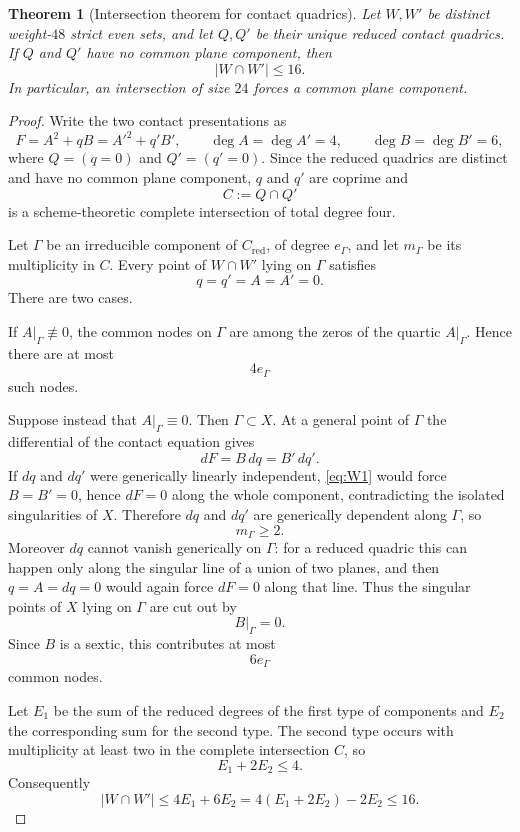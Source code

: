\documentclass[11pt,reqno]{amsart}
\newtheorem{theorem}{Theorem}[section]
\theoremstyle{remark}
\begin{document}
\begin{theorem}[Intersection theorem for contact quadrics]\label{thm:contact48}
Let $W,W'$ be distinct weight-$48$ strict even sets, and let $Q,Q'$ be their unique reduced contact quadrics.  If $Q$ and $Q'$ have no common plane component, then
\[
|W\cap W'|\le16.
\]
In particular, an intersection of size $24$ forces a common plane component.
\end{theorem}

\begin{proof}
Write the two contact presentations as
\[
F=A^2+qB=A'^2+q'B',
\qquad
\deg A=\deg A'=4,
\qquad
\deg B=\deg B'=6,
\]
where $Q=(q=0)$ and $Q'=(q'=0)$.  Since the reduced quadrics are distinct and have no common plane component, $q$ and $q'$ are coprime and
\[
C:=Q\cap Q'
\]
is a scheme-theoretic complete intersection of total degree four.

Let $\Gamma$ be an irreducible component of $C_{\mathrm{red}}$, of degree $e_\Gamma$, and let $m_\Gamma$ be its multiplicity in $C$.  Every point of $W\cap W'$ lying on $\Gamma$ satisfies
\[
q=q'=A=A'=0.
\]
There are two cases.

If $A|_\Gamma\not\equiv0$, the common nodes on $\Gamma$ are among the zeros of the quartic $A|_\Gamma$.  Hence there are at most
\[
4e_\Gamma
\]
such nodes.

Suppose instead that $A|_\Gamma\equiv0$.  Then $\Gamma\subset X$.  At a general point of $\Gamma$ the differential of the contact equation gives
\[
dF=B\,dq=B'\,dq'. \tag{W1}\label{eq:W1}
\]
If $dq$ and $dq'$ were generically linearly independent, \eqref{eq:W1} would force $B=B'=0$, hence $dF=0$ along the whole component, contradicting the isolated singularities of $X$.  Therefore $dq$ and $dq'$ are generically dependent along $\Gamma$, so
\[
m_\Gamma\ge2.
\]
Moreover $dq$ cannot vanish generically on $\Gamma$: for a reduced quadric this can happen only along the singular line of a union of two planes, and then $q=A=dq=0$ would again force $dF=0$ along that line.  Thus the singular points of $X$ lying on $\Gamma$ are cut out by
\[
B|_\Gamma=0.
\]
Since $B$ is a sextic, this contributes at most
\[
6e_\Gamma
\]
common nodes.

Let $E_1$ be the sum of the reduced degrees of the first type of components and $E_2$ the corresponding sum for the second type.  The second type occurs with multiplicity at least two in the complete intersection $C$, so
\[
E_1+2E_2\le4.
\]
Consequently
\[
|W\cap W'|
\le4E_1+6E_2
=4(E_1+2E_2)-2E_2
\le16.
\]
\end{proof}
\end{document}
